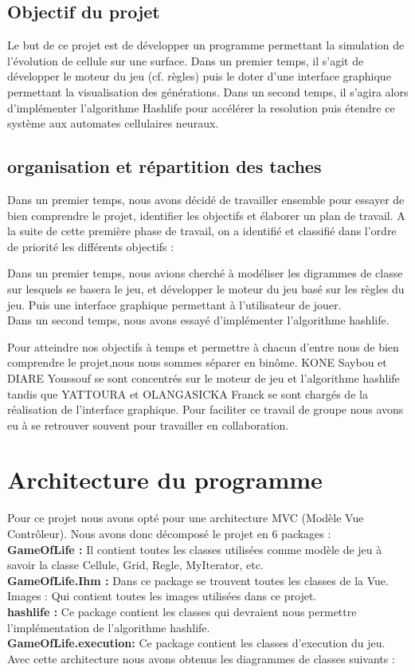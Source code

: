 \documentclass[a4paper,12pt]{article} %
\begin{document}
\subsection{Objectif du projet}

Le but de ce projet est de développer un programme permettant  la simulation de
l’évolution de cellule sur une surface.  Dans un premier temps, il s'agit de développer le moteur du jeu (cf. règles) puis le doter d'une interface graphique permettant la visualisation des générations. Dans un second temps, il s'agira alors d'implémenter l'algorithme Hashlife pour accélérer la resolution puis étendre ce système aux automates cellulaires neuraux.

\subsection{organisation et répartition des taches }
Dans un premier temps, nous avons décidé de travailler ensemble pour essayer de bien comprendre le projet, identifier les objectifs et élaborer un plan de travail.
A la suite de cette première phase de travail, on a identifié et classifié dans l’ordre de priorité les différents objectifs :

Dans un premier temps, nous avions cherché à modéliser les digrammes de classe sur lesquels se basera le jeu, et développer le moteur du jeu basé sur les règles du jeu. Puis une interface graphique permettant à l’utilisateur de jouer.\\   
Dans un second temps, nous avons essayé d'implémenter l'algorithme hashlife.

Pour atteindre nos objectifs à temps et permettre à chacun d’entre nous de bien comprendre le projet,nous nous sommes séparer en binôme. KONE Saybou et DIARE Youssouf se sont concentrés sur le moteur de jeu et l'algorithme hashlife tandis que YATTOURA et OLANGASICKA Franck se sont chargés de la réalisation de l'interface graphique. Pour faciliter ce travail de groupe nous avons eu à se retrouver souvent pour travailler en collaboration.
\section{Architecture du programme }
Pour ce projet nous avons opté pour une architecture MVC (Modèle Vue Contrôleur). Nous avons donc décomposé le projet en 6 packages :
\\\textbf{GameOfLife :} Il contient toutes les classes utilisées comme modèle de jeu à savoir la classe Cellule, Grid, Regle, MyIterator, etc.
\\\textbf{GameOfLife.Ihm : } Dans ce package se trouvent toutes les classes de la Vue.
Images : Qui contient toutes les images utilisées dans ce projet. 
\\\textbf{hashlife : } Ce package contient les classes qui devraient nous permettre l’implémentation de l’algorithme hashlife.
\\\textbf{GameOfLife.execution:}  Ce package contient les classes d'execution du jeu.
\\Avec cette architecture nous avons obtenus les diagrammes de classes suivants :
\end{document}
